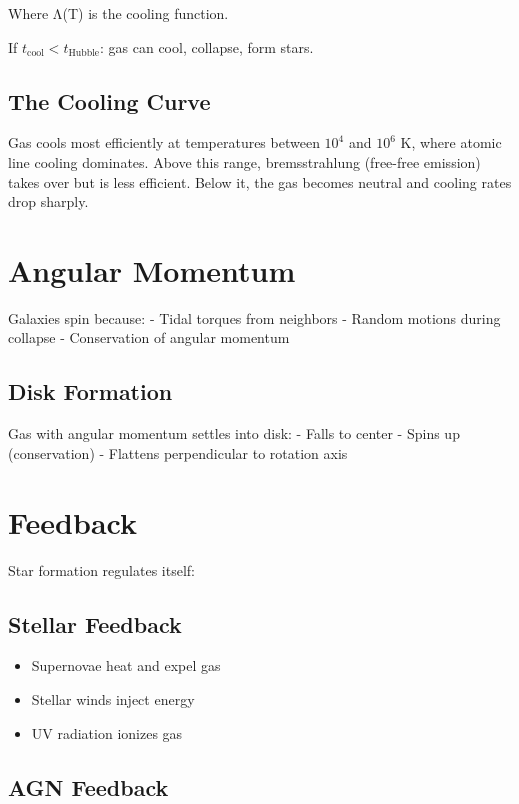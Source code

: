 \documentclass[
  11pt,
  letterpaper,
  twoside,
  openright]{book}
\providecommand{\tightlist}{%
  \setlength{\itemsep}{0pt}\setlength{\parskip}{0pt}}
\begin{document}
Where Λ(T) is the cooling function.

If \(t_{\text{cool}} < t_{\text{Hubble}}\): gas can cool, collapse, form
stars.

\subsection{The Cooling Curve}\label{the-cooling-curve}

Gas cools most efficiently at temperatures between \(10^4\) and \(10^6\)
K, where atomic line cooling dominates. Above this range, bremsstrahlung
(free-free emission) takes over but is less efficient. Below it, the gas
becomes neutral and cooling rates drop sharply.

\section{Angular Momentum}\label{angular-momentum-1}

Galaxies spin because: - Tidal torques from neighbors - Random motions
during collapse - Conservation of angular momentum

\subsection{Disk Formation}\label{disk-formation}

Gas with angular momentum settles into disk: - Falls to center - Spins
up (conservation) - Flattens perpendicular to rotation axis

\section{Feedback}\label{feedback}

Star formation regulates itself:

\subsection{Stellar Feedback}\label{stellar-feedback}

\begin{itemize}
\tightlist
\item
  Supernovae heat and expel gas
\item
  Stellar winds inject energy
\item
  UV radiation ionizes gas
\end{itemize}

\subsection{AGN Feedback}\label{agn-feedback}
\end{document}
